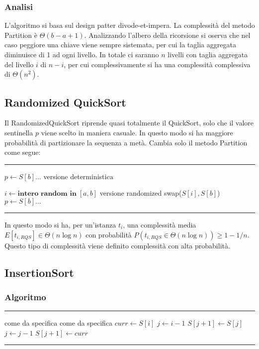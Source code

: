\documentclass[a4paper]{article}
\makeatletter
\newenvironment{algo}[4]{
	\noindent\rule{\textwidth}{0.4pt}
	\begin{algorithmic}[1]
		\addtocounter{ALG@line}{-1}
		\Procedure{#1}{#2}
		\Require #3
		\Ensure #4
		\Statex }{
		\EndProcedure
	\end{algorithmic}
	\rule{\textwidth}{0.4pt}}
\makeatother
\begin{document}
\subsubsection*{Analisi}
L'algoritmo si basa sul design patter divode-et-impera. La complessità del metodo Partition è \(\Theta(b-a+1)\). Analizzando
l'albero della ricorsione si oserva che nel caso peggiore una chiave viene sempre sistemata, per cui la taglia aggregata
diminuisce di 1 ad ogni livello. In totale ci saranno \(n\) livelli con taglia aggregata del livello \(i\) di \(n-i\), per
cui complessivamente si ha una complessità complessiva di \(\Theta(n^2)\).

\subsection{Randomized QuickSort}
Il RandomizedQuickSort riprende quasi totalmente il QuickSort, solo che il valore sentinella \(p\) viene scelto in maniera casuale.
In questo modo si ha maggiore probabilità di partizionare la sequenza a metà. Cambia solo il metodo Partition come segue:

\noindent\rule{\textwidth}{0.4pt}
\begin{algorithmic}[1]
	\State \(p \gets S[b] \dots\) \Comment versione deterministica
	\Statex
	\addtocounter{ALG@line}{-1}
	\State \(i \gets \textbf{intero random in} \; [a,b]\) \Comment versione randomized
	\State swap(\(S[i],S[b]\))
	\State \(p \gets S[b] \dots\)
\end{algorithmic}
\rule{\textwidth}{0.4pt}
In questo modo si ha, per un'istanza \(t_i\), una complessità media \(E[t_{i,RQS}] \in \Theta(n \log n)\) con probabilità
\(P(t_{i,RQS} \in \Theta(n \log n)) \geq 1 - 1/n\). Questo tipo di complessità viene definito complessità con alta probabilità.

\newpage

\subsection{InsertionSort}
\subsubsection*{Algoritmo}
\begin{algo}{InsertionSort}{$S$}{come da specifica}{come da specifica}
		\State \(curr \gets S[i]\)
		\State \(j \gets i-1\)
			\State \(S[j+1] \gets S[j]\)
			\State \(j \gets j-1\)
		\EndWhile
		\State \(S[j+1] \gets curr\)
	\EndFor
\end{algo}
\end{document}
